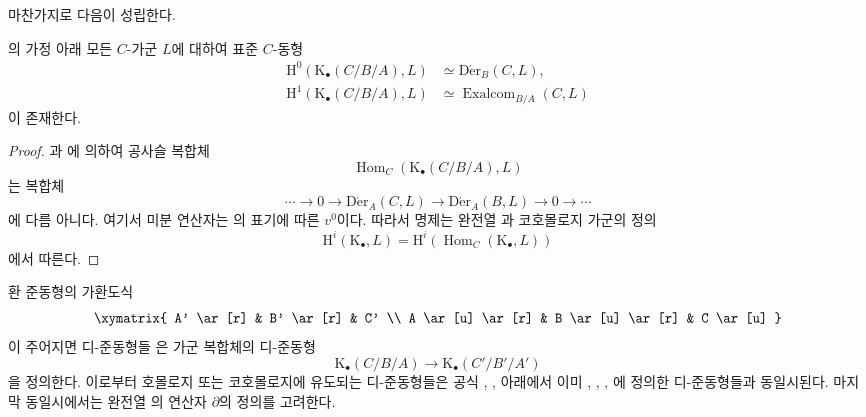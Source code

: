 마찬가지로 다음이 성립한다.
\begin{proposition}[20.6.6]
\label{0.20.6.6-ko}
의 가정 아래 모든 $C$-가군 $L$에 대하여
표준 $C$-동형
\begin{align}
\tag{20.6.6.1}
\label{0.20.6.6.1-ko}
  \mathrm H^0(\mathrm K_\bullet(C/B/A),L)
  &\simeq\operatorname{D\acute{e}r}_B(C,L),\\
\tag{20.6.6.2}
\label{0.20.6.6.2-ko}
  \mathrm H^1(\mathrm K_\bullet(C/B/A),L)
  &\simeq\operatorname{Exalcom}_{B/A}(C,L)
\end{align}
이 존재한다.
\end{proposition}

\begin{proof}
과 에 의하여 공사슬 복합체
\[
  \operatorname{Hom}_C(\mathrm K_\bullet(C/B/A),L)
\]
는 복합체
\[
  \cdots\longrightarrow0\longrightarrow
  \operatorname{D\acute{e}r}_A(C,L)
  \longrightarrow\operatorname{D\acute{e}r}_A(B,L)
  \longrightarrow0\longrightarrow\cdots
\]
에 다름 아니다.
여기서 미분 연산자는 의 표기에 따른
$v^0$이다. 따라서 명제는 완전열
과 코호몰로지 가군의 정의
\begin{equation}
\tag{20.6.6.3}
\label{0.20.6.6.3-ko}
  \mathrm H^i(\mathrm K_\bullet,L)
  =\mathrm H^i
  (\operatorname{Hom}_C(\mathrm K_\bullet,L))
\end{equation}
에서 따른다.
\end{proof}

환 준동형의 가환도식
\[
\xymatrix{
  A' \ar[r] & B' \ar[r] & C' \\
  A \ar[u] \ar[r] & B \ar[u] \ar[r] & C \ar[u]
}
\]
이 주어지면 디-준동형들 은 가군
복합체의 디-준동형
\begin{equation}
\tag{20.6.6.4}
\label{0.20.6.6.4-ko}
  \mathrm K_\bullet(C/B/A)\longrightarrow
  \mathrm K_\bullet(C'/B'/A')
\end{equation}
을 정의한다. 이로부터 호몰로지 또는 코호몰로지에 유도되는
디-준동형들은 공식 ,
,  아래에서 이미
, ,
, 에 정의한
디-준동형들과 동일시된다. 마지막 동일시에서는 완전열
의 연산자 $\partial$의 정의를 고려한다.

